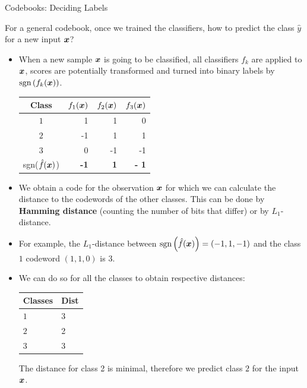 \begin{vbframe}{Codebooks: Deciding Labels}


For a general codebook, once we trained the classifiers, how to predict the class $\hat y$ for a new input $\bm{x}$?

\begin{itemize}
\item When a new sample $\bm{x}$ is going to be classified, all classifiers $f_k$ are applied to $\bm{x}$, scores are potentially transformed and turned into binary labels by $\text{sgn}\left(f_k(\bm{x})\right)$. 

\begin{table}[]
\footnotesize
\begin{tabular}{|c|r|r|r|} \hline
\textbf{Class}  & \textbf{$f_1{(\bm{x})}$} & \textbf{$f_2{(\bm{x})}$}  & \textbf{$f_3{(\bm{x})}$} \\ \hline
\textbf{$1$}              &   1                 & 1                   & 0                   \\ \hline
\textbf{$2$}              &  -1                 &  1                   & 1                   \\ \hline
\textbf{$3$}              &  0                 & -1                   &  -1                   \\ \hline
{sgn($\hat{f}(\bm{x})$)}    & \textbf{-1}         &  \textbf{1}          &  \textbf{- 1}          \\ \hline
\end{tabular}
\end{table}

\item We obtain a code for the observation $\bm{x}$ for which we can calculate the distance to the codewords of the other classes. This can be done by \textbf{Hamming distance} (counting the number of bits that differ) or by $L_1$-distance.
\item For example, the $L_1$-distance between $\text{sgn}\left(\hat f(\bm{x})\right) = \left(- 1, 1, -1\right)$ and the class $1$ codeword $\left(1, 1, 0\right)$ is $3$.
\item We can do so for all the classes to obtain respective distances: 

\begin{table}[]
\footnotesize
\begin{tabular}{|l|l|} \hline
\textbf{Classes}    & Dist \\ \hline
\textbf{$1$}        &   3       \\ \hline 
\textbf{$2$}        &   2       \\ \hline 
\textbf{$3$}        &   3       \\ \hline          
\end{tabular}
\end{table}

The distance for class 2 is minimal, therefore we predict class $2$ for the input $\bm{x}$. 
\end{itemize}

\end{vbframe}

